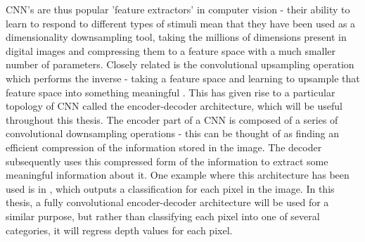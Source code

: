 CNN's are thus popular 'feature extractors' in computer vision - their ability to learn to respond to different types of stimuli mean that they have been used as a dimensionality downsampling tool, taking the millions of dimensions present in digital images  and compressing them to a feature space with a much smaller number of parameters. Closely related is the convolutional upsampling operation which performs the inverse - taking a feature space and learning to upsample that feature space into something meaningful \cite{long2014fcn}. This has given rise to a particular topology of CNN called the encoder-decoder architecture, which will be useful throughout this thesis. The encoder part of a CNN is composed of a series of convolutional downsampling operations - this can be thought of as finding an efficient compression of the information stored in the image. The decoder subsequently uses this compressed form of the information to extract some meaningful information about it. One example where this architecture has been used is in \cite{long2014fcn}, which outputs a classification for each pixel in the image. In this thesis, a fully convolutional encoder-decoder architecture will be used for a similar purpose, but rather than classifying each pixel into one of several categories, it will regress depth values for each pixel. 